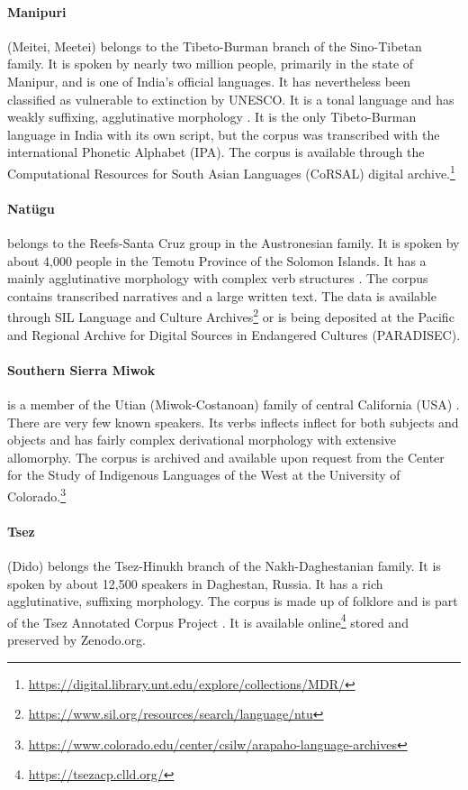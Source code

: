 \paragraph{Manipuri} 
(Meitei, Meetei) belongs to the Tibeto-Burman branch of the Sino-Tibetan family. It is spoken by nearly two million people, primarily in the state of Manipur, and is one of India's official languages. It has nevertheless been classified as vulnerable to extinction by UNESCO. It is a tonal language and has weakly suffixing, agglutinative morphology \citep{Chelliah-1997}. It is the only Tibeto-Burman language in India with its own script, but the corpus was transcribed with the international Phonetic Alphabet (IPA). The corpus is available through the Computational Resources for South Asian Languages (CoRSAL) digital archive.\footnote{\url{https://digital.library.unt.edu/explore/collections/MDR/}}

\paragraph{Natügu}
belongs to the Reefs-Santa Cruz group in the Austronesian family. It is spoken by about 4,000 people in the Temotu Province of the Solomon Islands. It has a mainly agglutinative morphology with complex verb structures \citep{naess_ntu_2008}. The corpus contains transcribed narratives and a large written text. The data is available through SIL Language and Culture Archives\footnote{\url{https://www.sil.org/resources/search/language/ntu}} or is being deposited at the Pacific and Regional Archive for Digital Sources in Endangered Cultures (PARADISEC).

\paragraph{Southern Sierra Miwok} 
is a member of the Utian (Miwok-Costanoan) family of central California (USA) \citep{broadbent_southern_1964}. There are very few known speakers. Its verbs inflects inflect for both subjects and objects and has fairly complex derivational morphology with extensive allomorphy. The corpus is archived and available upon request from the Center for the Study of Indigenous Languages of the West at the University of Colorado.\footnote{\url{https://www.colorado.edu/center/csilw/arapaho-language-archives}}

\paragraph{Tsez}
(Dido) belongs the Tsez-Hinukh branch of the Nakh-Daghestanian family. It is spoken by about 12,500 speakers in Daghestan, Russia. It has a rich agglutinative, suffixing morphology. The corpus is made up of folklore and is part of the Tsez Annotated Corpus Project \citep{abdulaev-tsezcorpus-2010}. It is available online\footnote{\url{https://tsezacp.clld.org/}} stored and preserved by Zenodo.org.

